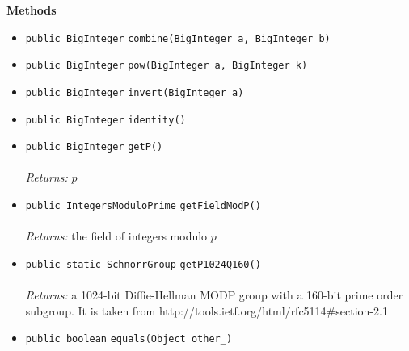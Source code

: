 \textbf{\sffamily Methods}
\begin{itemize}
\item \lstinline|public BigInteger| \lstinline|combine|\lstinline|(BigInteger a, BigInteger b)| \\[-0.6em]




\item \lstinline|public BigInteger| \lstinline|pow|\lstinline|(BigInteger a, BigInteger k)| \\[-0.6em]




\item \lstinline|public BigInteger| \lstinline|invert|\lstinline|(BigInteger a)| \\[-0.6em]




\item \lstinline|public BigInteger| \lstinline|identity|\lstinline|()| \\[-0.6em]




\item \lstinline|public BigInteger| \lstinline|getP|\lstinline|()|\\ \\[-0.6em]
\emph{Returns:} $p$



\item \lstinline|public IntegersModuloPrime| \lstinline|getFieldModP|\lstinline|()|\\ \\[-0.6em]
\emph{Returns:} the field of integers modulo $p$



\item \lstinline|public static SchnorrGroup| \lstinline|getP1024Q160|\lstinline|()|\\ \\[-0.6em]
\emph{Returns:} a 1024-bit Diffie-Hellman MODP group
 with a 160-bit prime order subgroup.
 It is taken from http://tools.ietf.org/html/rfc5114\#section-2.1



\item \lstinline|public boolean| \lstinline|equals|\lstinline|(Object other_)| \\[-0.6em]




\end{itemize}

